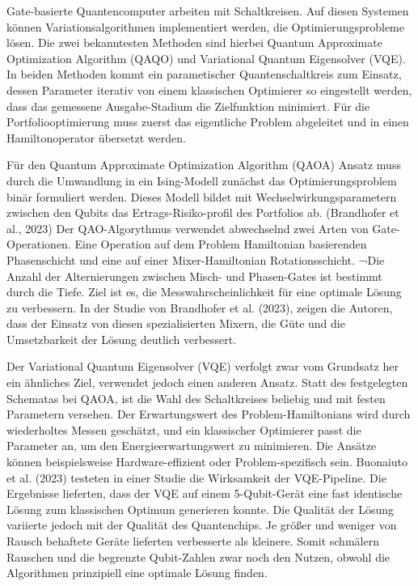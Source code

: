 Gate-basierte Quantencomputer arbeiten mit Schaltkreisen. Auf diesen Systemen können Variationsalgorithmen implementiert werden, die Optimierungsprobleme lösen. Die zwei bekanntesten Methoden sind hierbei Quantum Approximate Optimization Algorithm (QAQO) und Variational Quantum Eigensolver (VQE). In beiden Methoden kommt ein parametischer Quantenschaltkreis zum Einsatz, dessen Parameter iterativ von einem klassischen
Optimierer so eingestellt werden, dass das gemessene Ausgabe-Stadium die Zielfunktion minimiert. Für die Portfoliooptimierung muss zuerst das eigentliche Problem abgeleitet und in einen Hamiltonoperator übersetzt werden.
\cite{Buonaiuto et al., 2023, Brandhofer et al., 2023}

Für den Quantum Approximate Optimization Algorithm (QAOA) Ansatz muss durch die Umwandlung in ein Ising-Modell zunächst das Optimierungsproblem binär formuliert werden. Dieses Modell bildet mit Wechselwirkungsparametern zwischen den Qubits das Ertrags-Risiko-profil des Portfolios ab. (Brandhofer et al., 2023)
Der QAO-Algorythmus verwendet abwechselnd zwei Arten von Gate-Operationen. Eine Operation auf dem Problem Hamiltonian basierenden Phasenschicht und eine auf einer Mixer-Hamiltonian Rotationsschicht. ¬Die Anzahl der Alternierungen zwischen Misch- und Phasen-Gates ist bestimmt durch die Tiefe. Ziel ist es, die Messwahrscheinlichkeit für eine optimale Lösung zu verbessern. In der Studie von Brandhofer et al. (2023), zeigen die Autoren, dass der Einsatz von diesen spezialisierten Mixern, die Güte und die Umsetzbarkeit der Lösung deutlich verbessert. 

Der Variational Quantum Eigensolver (VQE) verfolgt zwar vom Grundsatz her ein ähnliches Ziel, verwendet jedoch einen anderen Ansatz. Statt des festgelegten Schematas bei QAOA, ist die Wahl des Schaltkreises beliebig und mit festen Parametern versehen. Der Erwartungswert des Problem-Hamiltonians wird durch wiederholtes Messen geschätzt, und ein klassischer Optimierer passt die Parameter an, um den Energieerwartungswert zu minimieren. Die Ansätze können beispielsweise Hardware-effizient oder Problem-spezifisch sein.
\cite{Buonaiuto et al., 2023}
Buonaiuto et al. (2023) testeten in einer Studie die Wirksamkeit der VQE-Pipeline. Die Ergebnisse lieferten, dass der VQE auf einem 5-Qubit-Gerät eine fast identische Lösung zum klassischen Optimum generieren konnte. Die Qualität der Lösung variierte jedoch mit der Qualität des Quantenchips. Je größer und weniger von Rausch behaftete Geräte lieferten verbesserte als kleinere. Somit schmälern Rauschen und die begrenzte Qubit-Zahlen zwar noch den Nutzen, obwohl die Algorithmen prinzipiell eine optimale Lösung finden. 
\cite{Buonaiuto et al., 2023}

